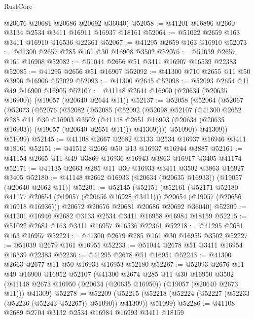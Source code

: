 \begin{lexlean}{RustCore}
\begin{coremodule}
      @20676
      @20681
      @20686
      @20692
      @36040)
@52058 := @41201 @16896 @2660 @3134 @2534 @3411 @16911 @16937 @18161
@52064 := @51022 @2659 @163 @3411 @16910 @16536 @22361
@52067 := @41295 @2659 @163 @16910
@52073 := @41300 @2657 @285 @161 @30 @16908 @3502
@52076 := @51039 @2657 @161 @16908
@52082 := @51044 @2656 @51 @3411 @16907 @16539 @22383
@52085 := @41295 @2656 @51 @16907
@52092 := @41300 @710 @2655 @11 @50 @3996 @16906 @52029
@52093 := @41300 @2645
@52098 := @52093 @2654 @11 @49 @16900 @16905
@52107 := @41148 @2644 @16900 (@20634 (@20635 @16900)) (@19057 (@20640 @2644 @11))
@52137 := @52058
    (@52064
      (@52067
        (@52073
          (@52076
            (@52082
              (@52085
                (@52092
                  (@52098
                    @52107
                    (@41300
                      @2652
                      @285
                      @11
                      @30
                      @16903
                      @3502
                      (@41148 @2651 @16903 (@20634 (@20635 @16903)) (@19057 (@20640 @2651 @11)))
                      @41309))))
              @51090))
          @41309))
      @51099)
@52145 := @41108 @2667 @2682 @3133 @2534 @16937 @16946 @3411 @18161
@52151 := @41512 @2666 @50 @13 @16937 @16944 @3887
@52161 := @41154 @2665 @11 @49 @3869 @16936 @16943 @3863 @16917 @3405 @41174
@52171 := @41135 @2663 @285 @11 @30 @16933 @3411 @3502 @3863 @16927 @3405
@52180 := @41148 @2662 @16933 (@20634 (@20635 @16933)) (@19057 (@20640 @2662 @11))
@52201 := @52145
    (@52151
      (@52161
        (@52171 @52180 @41177 @20654 (@19057 (@20656 @16928 @3411)))
        @20654
        (@19057 (@20656 @16918 @16936)))
      @20672
      @20676
      @20681
      @20686
      @20692
      @36040)
@52209 := @41201 @16946 @2682 @3133 @2534 @3411 @16958 @16984 @18159
@52215 := @51022 @2681 @163 @3411 @16957 @16536 @22361
@52218 := @41295 @2681 @163 @16957
@52224 := @41300 @2679 @285 @161 @30 @16955 @3502
@52227 := @51039 @2679 @161 @16955
@52233 := @51044 @2678 @51 @3411 @16954 @16539 @22383
@52236 := @41295 @2678 @51 @16954
@52243 := @41300 @2663 @2677 @11 @50 @16933 @16953 @52180
@52267 := @52093
    @2676
    @11
    @49
    @16900
    @16952
    @52107
    (@41300
      @2674
      @285
      @11
      @30
      @16950
      @3502
      (@41148 @2673 @16950 (@20634 (@20635 @16950)) (@19057 (@20640 @2673 @11)))
      @41309)
@52278 := @52209
    (@52215 (@52218 (@52224 (@52227 (@52233 (@52236 (@52243 @52267)) @51090)) @41309)) @51099)
@52286 := @41108 @2689 @2704 @3132 @2534 @16984 @16993 @3411 @18159

\end{coremodule}
\end{lexlean}
